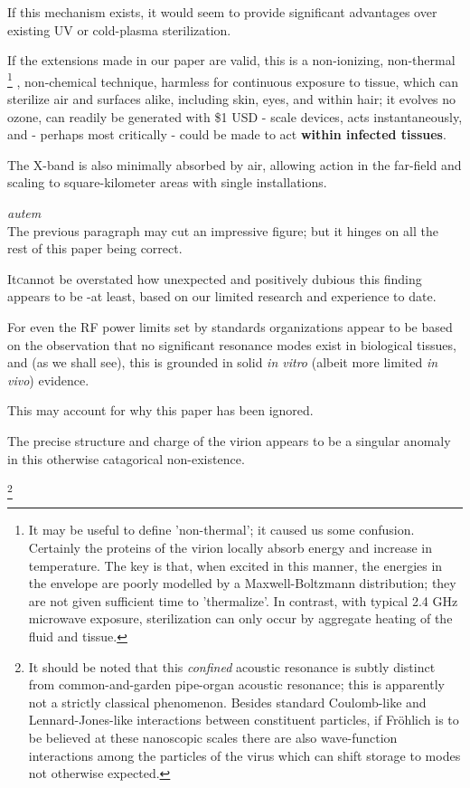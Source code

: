 \documentclass[fleqn,10pt]{article}
\begin{document}
\begin{multicols}{1}
If this mechanism exists, it would seem to provide significant advantages over existing UV or cold-plasma sterilization. 

If the extensions made in our paper are valid, this is a non-ionizing, non-thermal
%
\footnote{It may be useful to define 'non-thermal'; it caused us some confusion. Certainly the proteins of the virion locally absorb energy and increase in temperature. The key is that, when excited in this manner, the energies in the envelope are poorly modelled by a Maxwell-Boltzmann distribution; they are not given sufficient time to 'thermalize'. In contrast, with typical 2.4 GHz microwave exposure, sterilization can only occur by aggregate heating of the fluid and tissue.} 
%
, non-chemical technique, harmless for continuous exposure to tissue, which can sterilize air and surfaces alike, including skin, eyes, and within hair; it evolves no ozone, can readily be generated with \$1 USD - scale devices, acts instantaneously, and - perhaps most critically - could be made to act {\bf within infected tissues}.

The X-band is also minimally absorbed by air, allowing action in the far-field and scaling to square-kilometer areas with single installations.

\begin{autem}

{\it autem}\\
The previous paragraph may cut an impressive figure; but it hinges on all the rest of this paper being correct.

\end{autem}

\lettrine{It} cannot be overstated how unexpected and positively dubious this finding appears to be -at least, based on our limited research and experience to date.

For even the RF power limits set by standards organizations appear to be based on the observation that no significant resonance modes exist in biological tissues, and (as we shall see), this is grounded in solid {\it in vitro} (albeit more limited {\it in vivo}) evidence. 

This may account for why this paper has been ignored.

The precise structure and charge of the virion appears to be a singular anomaly in this otherwise catagorical non-existence.


\footnote{It should be noted that this {\it confined} acoustic resonance is subtly distinct from common-and-garden pipe-organ acoustic resonance; this is apparently not a strictly classical phenomenon. Besides standard Coulomb-like and Lennard-Jones-like interactions between constituent particles, if Fr\"{o}hlich is to be believed at these nanoscopic scales there are also wave-function interactions among the particles of the virus which can shift storage to modes not otherwise expected.

}
\end{multicols}
\end{document}
